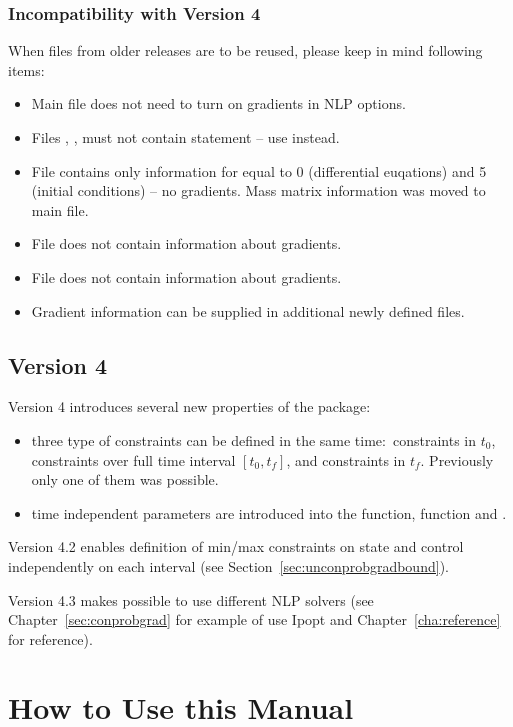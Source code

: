 \subsubsection*{Incompatibility with Version 4}
When files from older releases are to be reused, please keep in mind
following items:
\begin{itemize}
\item Main file does not need to turn on gradients in NLP options.
\item Files , ,  must
  not contain  statement -- use  instead. 
\item File  contains only information for 
  equal to 0 (differential euqations) and 5 (initial conditions) -- no
  gradients. Mass matrix information was moved to main file.
\item File  does not contain information about gradients.
\item File  does not contain information about gradients.
\item Gradient information can be supplied in additional newly defined
  files.
\end{itemize}

\subsection*{Version 4}
Version 4 introduces several new properties of the package:
\begin{itemize}
\item three type of constraints can be defined in the same
  time:~constraints in $t_{0}$, constraints over full time interval 
  $[t_{0},t_{f}]$, and constraints in $t_{f}$. Previously only one of
  them was possible.
\item time independent parameters are introduced into the 
  function,  function and .
\end{itemize}
Version 4.2 enables definition of min/max constraints on state and
control independently on each interval (see
Section~\ref{sec:unconprobgradbound}).

Version 4.3 makes possible to use different NLP solvers (see
Chapter~\ref{sec:conprobgrad} for example of use Ipopt and
Chapter~\ref{cha:reference} for reference).

\section{How to Use this Manual}
\label{sec:howtouseman}

